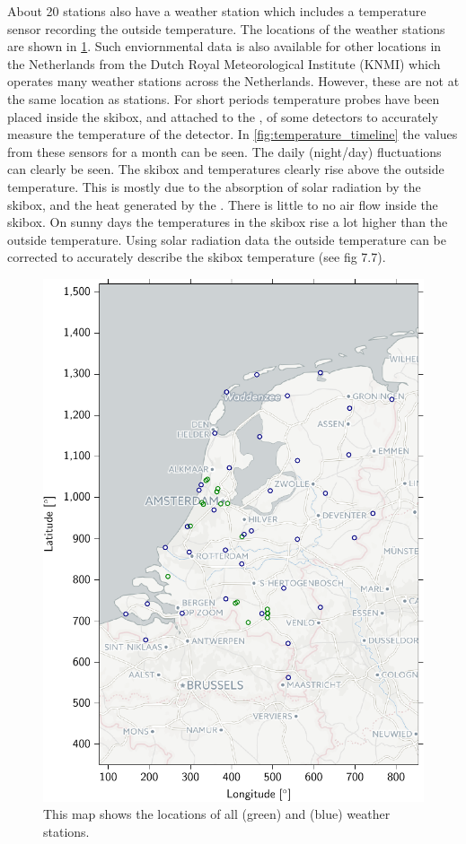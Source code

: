 About 20 \hisparc stations also have a weather station which includes a temperature sensor recording the outside temperature. The locations of the weather stations are shown in \cref{fig:weather-map}. Such enviornmental data is also available for other locations in the Netherlands from the Dutch Royal Meteorological Institute (KNMI) which operates many weather stations across the Netherlands. However, these are not at the same location as \hisparc stations. For short periods temperature probes have been placed inside the skibox, and attached to the \pmt, of some detectors to accurately measure the temperature of the detector. In \cref{fig:temperature_timeline} the values from these sensors for a month can be seen. The daily (night/day) fluctuations can clearly be seen. The skibox and \pmt temperatures clearly rise above the outside temperature. This is mostly due to the absorption of solar radiation by the skibox, and the heat generated by the \pmt. There is little to no air flow inside the skibox. On sunny days the temperatures in the skibox rise a lot higher than the outside temperature. Using solar radiation data the outside temperature can be corrected to accurately describe the skibox temperature (see \cite{devries2012weather} fig 7.7).

\begin{figure}
    \centering
    \includegraphics[width=.6\linewidth]{plots/detector/weather-map}
    \caption{This map shows the locations of all \hisparc (green) and \knmi (blue) weather stations.}
    \label{fig:weather-map}
\end{figure}

